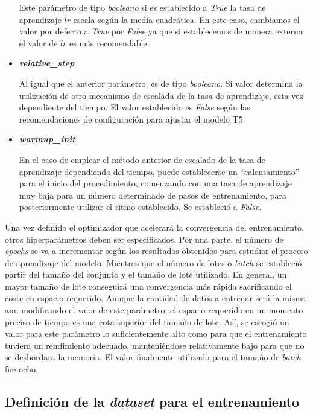 \begin{itemize}
    Este parámetro de tipo \textit{booleano} si es establecido a \textit{True} la tasa de aprendizaje $lr$ escala según la media cuadrática. En este caso, cambiamos el valor por defecto a \textit{True} por \textit{False} ya que si establecemos de manera externa el valor de $lr$ es más recomendable.
    
    \item \textbf{\textit{relative\_step }} \hfill
    
    Al igual que el anterior parámetro, es de tipo \textit{booleano}. Si valor determina la utilización de otro mecanismo de escalada de la tasa de aprendizaje, esta vez dependiente del tiempo. El valor establecido es \textit{False} según las recomendaciones de configuración para ajustar el modelo T5.
    
    \item \textbf{\textit{warmup\_init }} \hfill
    
    En el caso de emplear el método anterior de escalado de la tasa de aprendizaje dependiendo del tiempo, puede establecerse un ``calentamiento'' para el inicio del procedimiento, comenzando con una tasa de aprendizaje muy baja para un número determinado de pasos de entrenamiento, para posteriormente utilizar el ritmo establecido. Se estableció a \textit{False}. 

\end{itemize}

Una vez definido el optimizador que acelerará la convergencia del entrenamiento, otros hiperparámetros deben ser especificados. Por una parte, el número de \textit{epochs} se va a incrementar según los resultados obtenidos para estudiar el proceso de aprendizaje del modelo. Mientras que el número de lotes o \textit{batch} se estableció partir del tamaño del conjunto y el tamaño de lote utilizado. En general, un mayor tamaño de lote conseguirá una convergencia más rápida sacrificando el coste en espacio requerido. Aunque la cantidad de datos a entrenar será la misma aun modificando el valor de este parámetro, el espacio requerido en un momento preciso de tiempo es una cota superior del tamaño de lote. Así, se escogió un valor para este parámetro lo suficientemente alto como para que el entrenamiento tuviera un rendimiento adecuado, manteniéndose relativamente bajo para que no se desbordara la memoria. El valor finalmente utilizado para el tamaño de \textit{batch} fue ocho.

\subsection{Definición de la \textit{dataset} para el entrenamiento}

